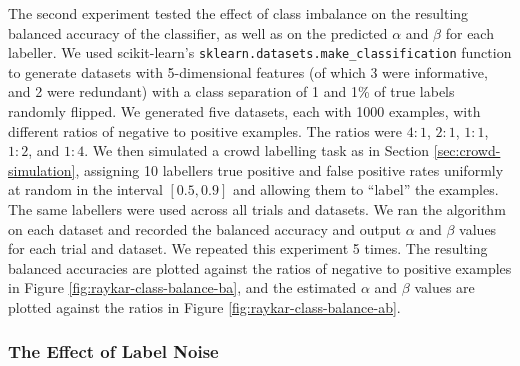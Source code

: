             The second experiment tested the effect of class imbalance on the
            resulting balanced accuracy of the classifier, as well as on the
            predicted $\alpha$ and $\beta$ for each labeller. We used
            scikit-learn's \texttt{sklearn.datasets.make\_classification}
            function \citep{scikit-learn} to generate datasets with
            5-dimensional features (of which 3 were informative, and 2 were
            redundant) with a class separation of 1 and 1\% of true labels
            randomly flipped. We generated five datasets, each with 1000
            examples, with different ratios of negative to positive examples.
            The ratios were $4:1$, $2:1$, $1:1$, $1:2$, and $1:4$. We then
            simulated a crowd labelling task as in Section
            \ref{sec:crowd-simulation}, assigning 10 labellers true positive and
            false positive rates uniformly at random in the interval $[0.5,
            0.9]$ and allowing them to ``label'' the examples. The same
            labellers were used across all trials and datasets. We ran the
            \citeauthor{raykar10} algorithm on each dataset and recorded the
            balanced accuracy and output $\alpha$ and $\beta$ values for each
            trial and dataset. We repeated this experiment 5 times. The
            resulting balanced accuracies are plotted against the ratios of
            negative to positive examples in Figure
            \ref{fig:raykar-class-balance-ba}, and the estimated $\alpha$ and
            $\beta$ values are plotted against the ratios in Figure
            \ref{fig:raykar-class-balance-ab}.


            \clearpage

        \subsubsection{The Effect of Label Noise}

